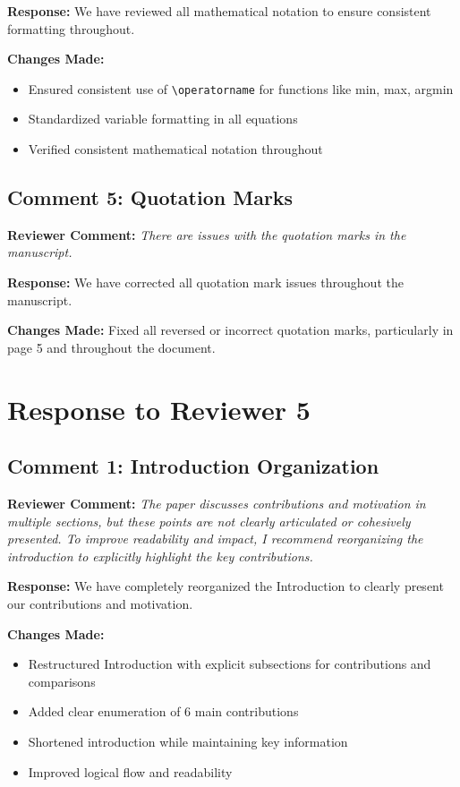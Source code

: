 \documentclass[11pt]{article}
\newcommand{\reviewercomment}[1]{\textbf{Reviewer Comment:} \textit{#1}}
\newcommand{\response}[1]{\textbf{Response:} #1}
\newcommand{\changes}[1]{\textbf{Changes Made:} #1}
\begin{document}
\response{We have reviewed all mathematical notation to ensure consistent formatting throughout.}

\changes{
\begin{itemize}
\item Ensured consistent use of \texttt{\textbackslash operatorname} for functions like min, max, argmin
\item Standardized variable formatting in all equations
\item Verified consistent mathematical notation throughout
\end{itemize}
}

\subsection*{Comment 5: Quotation Marks}

\reviewercomment{There are issues with the quotation marks in the manuscript.}

\response{We have corrected all quotation mark issues throughout the manuscript.}

\changes{Fixed all reversed or incorrect quotation marks, particularly in page 5 and throughout the document.}

\section*{Response to Reviewer 5}

\subsection*{Comment 1: Introduction Organization}

\reviewercomment{The paper discusses contributions and motivation in multiple sections, but these points are not clearly articulated or cohesively presented. To improve readability and impact, I recommend reorganizing the introduction to explicitly highlight the key contributions.}

\response{We have completely reorganized the Introduction to clearly present our contributions and motivation.}

\changes{
\begin{itemize}
\item Restructured Introduction with explicit subsections for contributions and comparisons
\item Added clear enumeration of 6 main contributions
\item Shortened introduction while maintaining key information
\item Improved logical flow and readability
\end{itemize}
}
\end{document}
